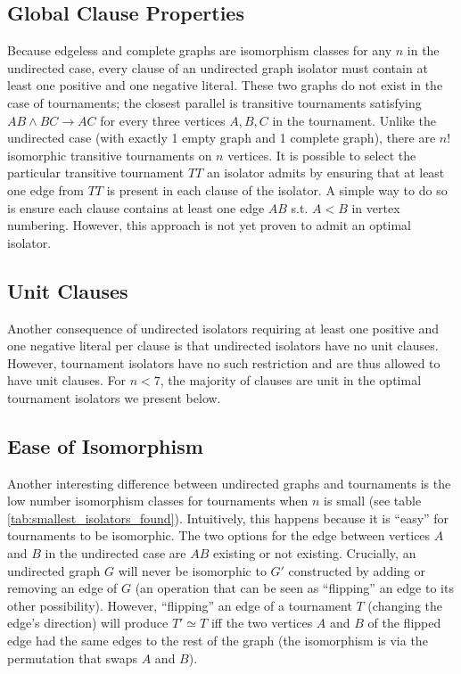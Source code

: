 \documentclass[a4paper,UKenglish,cleveref, autoref, thm-restate]{lipics-v2021}
\begin{document}
\subsection{Global Clause Properties}
Because edgeless and complete graphs are isomorphism classes for any $n$ in the undirected case, every clause of an undirected graph isolator must contain at least one positive and one negative literal. These two graphs do not exist in the case of tournaments; the closest parallel is transitive tournaments satisfying $AB \land BC \rightarrow AC$ for every three vertices $A,B,C$ in the tournament. Unlike the undirected case (with exactly 1 empty graph and 1 complete graph), there are $n!$ isomorphic transitive tournaments on $n$ vertices. It is possible to select the particular transitive tournament $TT$ an isolator admits by ensuring that at least one edge from $TT$ is present in each clause of the isolator. A simple way to do so is ensure each clause contains at least one edge $AB$ s.t. $A<B$ in vertex numbering. However, this approach is not yet proven to admit an optimal isolator.

\subsection{Unit Clauses}
Another consequence of undirected isolators requiring at least one positive and one negative literal per clause is that undirected isolators have no unit clauses. However, tournament isolators have no such restriction and are thus allowed to have unit clauses. For $n<7$, the majority of clauses are unit in the optimal tournament isolators we present below.

\subsection{Ease of Isomorphism}
Another interesting difference between undirected graphs and tournaments is the low number isomorphism classes for tournaments when $n$ is small (see table \ref{tab:smallest_isolators_found}). Intuitively, this happens because it is ``easy'' for tournaments to be isomorphic. The two options for the edge between vertices $A$ and $B$ in the undirected case are $AB$ existing or not existing. Crucially, an undirected graph $G$ will never be isomorphic to $G'$ constructed by adding or removing an edge of $G$ (an operation that can be seen as ``flipping'' an edge to its other possibility). However, ``flipping'' an edge of a tournament $T$ (changing the edge's direction) will produce $T' \simeq T$ iff the two vertices $A$ and $B$ of the flipped edge had the same edges to the rest of the graph (the isomorphism is via the permutation that swaps $A$ and $B$).
\end{document}
